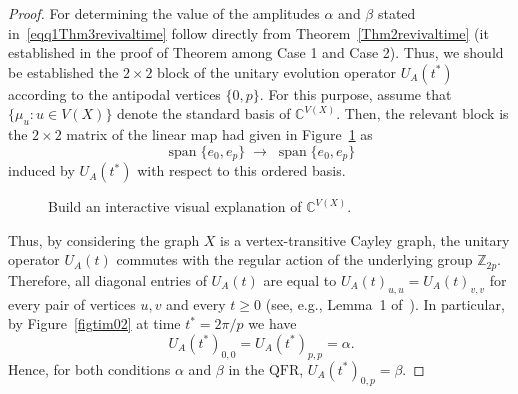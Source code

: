 \documentclass[12pt]{amsart}
\newcommand{\QFR}{\mathrm{QFR}}
\begin{document}
\begin{proof}
For determining the value of  the amplitudes $\alpha$ and $\beta$ stated in~\eqref{eqq1Thm3revivaltime} follow directly from Theorem~\ref{Thm2revivaltime} (it established in the proof of Theorem among Case 1 and Case 2). Thus, we should be established the $2\times 2$ block of the unitary evolution operator $U_A(t^*)$ according to the antipodal vertices $\{0,p\}$. 
For this purpose, assume that $\{\mu_u : u\in V(X)\}$ denote the standard basis of $\mathbb{C}^{V(X)}$. Then, the relevant block is the $2\times 2$ matrix of the linear map had given in Figure~\ref{figtim01} as
  \[
    \operatorname{span}\{e_0,e_p\} \;\longrightarrow\; \operatorname{span}\{e_0,e_p\}
  \]
  induced by $U_A(t^*)$ with respect to this ordered basis.
\begin{figure}[H]
    \centering
{}
    \caption{Build an interactive visual explanation of $\mathbb{C}^{V(X)}$.}
    \label{figtim01}
\end{figure}


Thus, by considering the graph $X$ is a vertex-transitive Cayley graph, the unitary operator $U_A(t)$ commutes with the regular action of the underlying group $\mathbb{Z}_{2p}$. Therefore, all diagonal entries of $U_A(t)$ are equal to $U_A(t)_{u,u}=U_A(t)_{v,v}$ for every pair of vertices $u,v$ and every $t\geq 0$ (see, e.g., Lemma~1 of~\cite{soni2025original}). 
In particular, by Figure~\ref{figtim02} at time $t^*=2\pi/p$ we have
\begin{equation}~\label{eqq3Thm3revivaltime}
 U_A(t^*)_{0,0} = U_A(t^*)_{p,p} = \alpha.
\end{equation}
Hence, for both conditions $\alpha$ and $\beta$ in the $\QFR$, $ U_A(t^*)_{0,p} = \beta.$


\end{proof}
\end{document}
